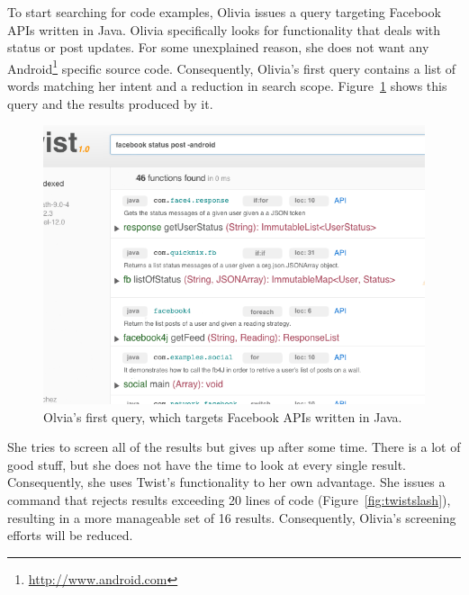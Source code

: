 To start searching for code examples, Olivia issues a query targeting Facebook APIs written in Java. Olivia specifically looks for functionality that deals with status or post updates. For some unexplained reason, she does not want any Android\footnote{\url{http://www.android.com}} specific source code. Consequently, Olivia's first query contains a list of words matching her intent and a reduction in search scope. Figure~\ref{fig:twistquery} shows this query and the results produced by it. 

\begin{figure}[!ht]
    \centering
    \includegraphics[width=\textwidth]{images/twistquery}
    \caption{Olvia's first query, which targets Facebook APIs written in Java.}
    \label{fig:twistquery}
\end{figure}

She tries to screen all of the results but gives up after some time. There is a lot of good stuff, but she does not have the time to look at every single result. Consequently, she uses Twist's functionality to her own advantage. She issues a command that rejects results exceeding 20 lines of code (Figure~\ref{fig:twistslash}), resulting in a more manageable set of 16 results. Consequently, Olivia's screening efforts will be reduced.

